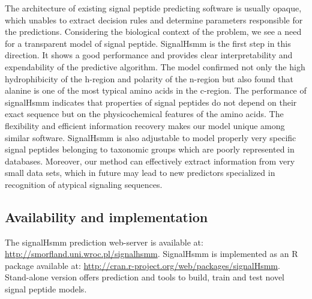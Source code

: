\documentclass[fleqn,10pt,twoside]{gcb15submission}
\begin{document}
The architecture of existing signal peptide predicting software is usually opaque, which unables to extract decision rules and determine parameters responsible for the predictions. Considering the biological context of the problem, we see a need for a transparent model of signal peptide. SignalHsmm is the first step in this direction. 
It shows a good performance and provides clear interpretability and expendability of  the predictive algorithm. 
The model confirmed not only the high hydrophibicity of the h-region and polarity of the n-region but also found that alanine is one of the most typical amino acids in the c-region.
The performance of signalHsmm indicates that properties of signal peptides do not depend on their exact sequence but on the physicochemical features of the amino acids. 
The flexibility and efficient information recovery makes our model unique among similar software. SignalHsmm is also adjustable to model properly very specific signal peptides belonging to taxonomic groups which are poorly represented in databases. Moreover, our method can effectively extract information from very small data sets, which in future may lead to new predictors specialized in recognition of atypical signaling sequences.

\subsection*{Availability and implementation}
The signalHsmm prediction web-server is available at: \url{http://smorfland.uni.wroc.pl/signalhsmm}. SignalHsmm is implemented as an R package available at: \url{http://cran.r-project.org/web/packages/signalHsmm}. Stand-alone version offers prediction and tools to build, train and test novel signal peptide models.



\end{document}
